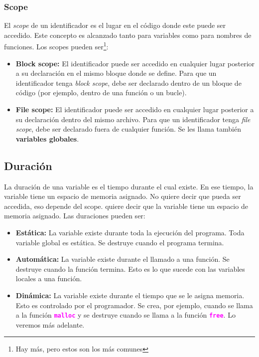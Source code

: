 \documentclass[]{scrartcl}
\newcommand{\hl}[1]{\textcolor{magenta}{\textbf{\texttt{#1}}}}
\begin{document}
\subsubsection*{Scope}
El \textit{scope} de un identificador es el lugar en el código donde este puede ser accedido. Este concepto es alcanzado tanto para variables como para nombres de funciones.
Los scopes pueden ser\footnote{Hay más, pero estos son los más comunes}:
\begin{itemize}
    \item \textbf{Block scope:} El identificador puede ser accedido en cualquier lugar posterior a su declaración en el mismo bloque donde se define. Para que un identificador tenga \textit{block scope}, debe ser declarado dentro de un bloque de código (por ejemplo, dentro de una función o un bucle).
    \item \textbf{File scope:} El identificador puede ser accedido en cualquier lugar posterior a su declaración dentro del mismo archivo. Para que un identificador tenga \textit{file scope}, debe ser declarado fuera de cualquier función. Se les llama también \textbf{variables globales}.
\end{itemize}

\subsection*{Duración}
La duración de una variable es el tiempo durante el cual existe. En ese tiempo, la variable tiene un espacio de memoria asignado. No quiere decir que pueda ser accedida, eso depende del scope. quiere decir que la variable tiene un espacio de memoria asignado.
Las duraciones pueden ser:
\begin{itemize}
    \item \textbf{Estática:} La variable existe durante toda la ejecución del programa. Toda variable global es estática. Se destruye cuando el programa termina.
    \item \textbf{Automática:} La variable existe durante el llamado a una función. Se destruye cuando la función termina. Esto es lo que sucede con las variables locales a una función.
    \item \textbf{Dinámica:} La variable existe durante el tiempo que se le asigna memoria. Esto es controlado por el programador. Se crea, por ejemplo, cuando se llama a la función \hl{malloc} y se destruye cuando se llama a la función \hl{free}. Lo veremos más adelante.
\end{itemize}
\end{document}
